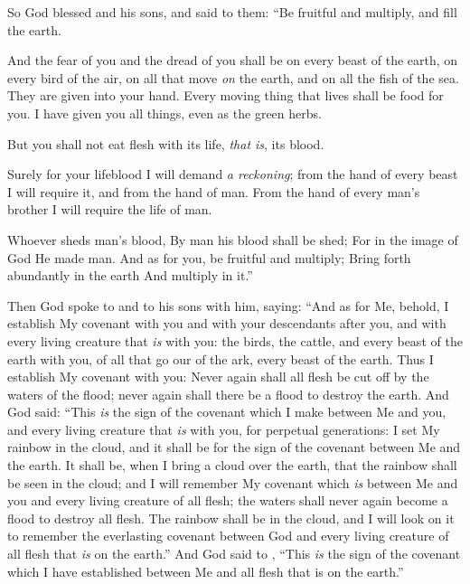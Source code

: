 
\bverse So God blessed  and his sons, and said to them: ``Be fruitful and multiply, and fill the earth.

\bverse And the fear of you and the dread of you shall be on every beast of the earth, on every bird of the air, on all that move \textit{on} the earth, and on all the fish of the sea. They are given into your hand.
\bverse Every moving thing that lives shall be food for you. I have given you all things, even as the green herbs.

\bverse But you shall not eat flesh with its life, \textit{that is}, its blood.

\bverse Surely for your lifeblood I will demand \textit{a reckoning}; from the hand of every beast I will require it, and from the hand of man. From the hand of every man's brother I will require the life of man.
\begin{bquotation}
\bverse Whoever sheds man's blood, By man his blood shall be shed; For in the image of God He made man. 
\bverse And as for you, be fruitful and multiply; Bring forth abundantly in the earth And multiply in it.''
\end{bquotation}
\bverse Then God spoke to  and to his sons with him, saying:
\bverse ``And as for Me, behold, I establish My covenant with you and with your descendants after you,
\bverse and with every living creature that \textit{is} with you: the birds, the cattle, and every beast of the earth with you, of all that go our of the ark, every beast of the earth.
\bverse Thus I establish My covenant with you: Never again shall all flesh be cut off by the waters of the flood; never again shall there be a flood to destroy the earth.
\bverse And God said: ``This \textit{is} the sign of the covenant which I make between Me and you, and every living creature that \textit{is} with you, for perpetual generations:
\bverse I set My rainbow in the cloud, and it shall be for the sign of the covenant between Me and the earth.
\bverse It shall be, when I bring a cloud over the earth, that the rainbow shall be seen in the cloud;
\bverse and I will remember My covenant which \textit{is} between Me and you and every living creature of all flesh; the waters shall never again become a flood to destroy all flesh.
\bverse The rainbow shall be in the cloud, and I will look on it to remember the everlasting covenant between God and every living creature of all flesh that \textit{is} on the earth.''
\bverse And God said to , ``This \textit{is} the sign of the covenant which I have established between Me and all flesh that is on the earth.''

